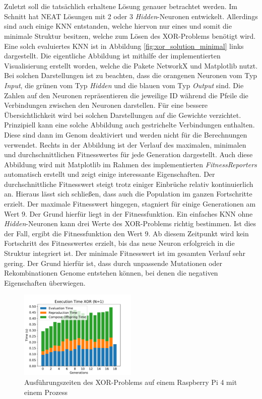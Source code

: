\\\\
Zuletzt soll die tatsächlich erhaltene Lösung genauer betrachtet werden. Im Schnitt hat \ac{NEAT} Lösungen mit 2 oder 3 \emph{Hidden}-Neuronen entwickelt. Allerdings sind auch einige \ac{KNN} entstanden, welche hiervon nur eines und somit die minimale Struktur besitzen, welche zum Lösen des XOR-Problems benötigt wird. Eine solch evaluiertes \ac{KNN} ist in Abbildung \ref{fig:xor_solution_minimal} links dargestellt. Die eigentliche Abbildung ist mithilfe der implementierten Visualisierung erstellt worden, welche die Pakete NetworkX und Matplotlib nutzt. Bei solchen Darstellungen ist zu beachten, dass die orangenen Neuronen vom Typ \emph{Input}, die grünen vom Typ \emph{Hidden} und die blauen vom Typ \emph{Output} sind. Die Zahlen auf den Neuronen repräsentieren die jeweilige ID während die Pfeile die Verbindungen zwischen den Neuronen darstellen. Für eine bessere Übersichtlichkeit wird bei solchen Darstellungen auf die Gewichte verzichtet. Prinzipiell kann eine solche Abbildung auch gestrichelte Verbindungen enthalten. Diese sind dann im Genom deaktiviert und werden nicht für die Berechnungen verwendet. Rechts in der Abbildung ist der Verlauf des maximalen, minimalen und durchschnittlichen Fitnesswertes für jede Generation dargestellt. Auch diese Abbildung wird mit Matplotlib im Rahmen des implementierten \emph{FitnessReporters} automatisch erstellt und zeigt einige interessante Eigenschaften. Der durchschnittliche Fitnesswert steigt trotz einiger Einbrüche relativ kontinuierlich an. Hieraus lässt sich schließen, dass auch die Population im ganzen Fortschritte erzielt. Der maximale Fitnesswert hingegen, stagniert für einige Generationen am Wert $9$. Der Grund hierfür liegt in der Fitnessfunktion. Ein einfaches \ac{KNN} ohne \emph{Hidden}-Neuronen kann drei Werte des XOR-Problems richtig bestimmen. Ist dies der Fall, ergibt die Fitnessfunktion den Wert $9$. Ab diesem Zeitpunkt wird kein Fortschritt des Fitnesswertes erzielt, bis das neue Neuron erfolgreich in die Struktur integriert ist. Der minimale Fitnesswert ist im gesamten Verlauf sehr gering. Der Grund hierfür ist, dass durch unpassende Mutationen oder Rekombinationen Genome entstehen können, bei denen die negativen Eigenschaften überwiegen. 
\begin{figure}[!h]
	\centering
	\includegraphics[width=0.5\textwidth]{./img/xor_single_core/xor_execution_time_1.pdf} 
	\caption{Ausführungszeiten des XOR-Problems auf einem Raspberry Pi 4 mit einem Prozess}
	\label{fig:xor_single_core_performance}
\end{figure}
